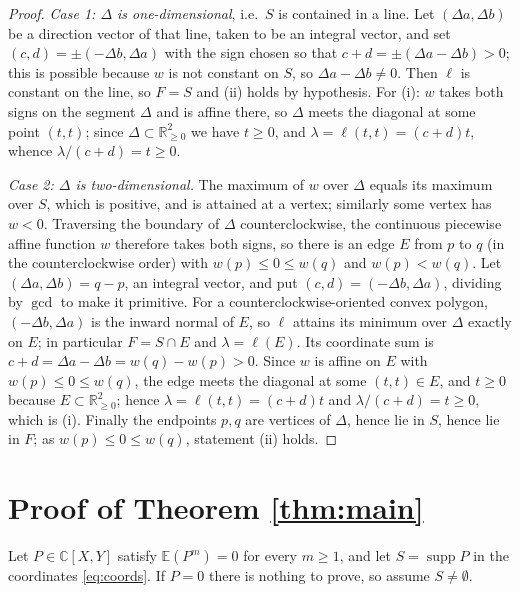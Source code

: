 \documentclass[10pt,a4paper]{amsart}
\numberwithin{equation}{section}
\DeclareMathOperator{\supp}{supp}
\newcommand{\C}{\mathbb{C}}
\newcommand{\E}{\mathbb{E}}
\begin{document}
\begin{proof}
\emph{Case 1: $\Delta$ is one-dimensional}, i.e.\ $S$ is contained in a line.
Let $(\Delta a,\Delta b)$ be a direction vector of that line, taken to be an
integral vector, and set $(c,d)=\pm(-\Delta b,\Delta a)$ with the sign chosen so
that $c+d=\pm(\Delta a-\Delta b)>0$; this is possible because $w$ is not
constant on $S$, so $\Delta a-\Delta b\ne0$. Then $\ell$ is constant on the
line, so $F=S$ and (ii) holds by hypothesis. For (i): $w$ takes both signs on
the segment $\Delta$ and is affine there, so $\Delta$ meets the diagonal at some
point $(t,t)$; since $\Delta\subset\mathbb R_{\ge0}^2$ we have $t\ge0$, and
$\lambda=\ell(t,t)=(c+d)t$, whence $\lambda/(c+d)=t\ge0$.

\emph{Case 2: $\Delta$ is two-dimensional.} The maximum of $w$ over $\Delta$
equals its maximum over $S$, which is positive, and is attained at a vertex;
similarly some vertex has $w<0$. Traversing the boundary of $\Delta$
counterclockwise, the continuous piecewise affine function $w$ therefore takes
both signs, so there is an edge $E$ from $p$ to $q$ (in the counterclockwise
order) with $w(p)\le0\le w(q)$ and $w(p)<w(q)$. Let
$(\Delta a,\Delta b)=q-p$, an integral vector, and put
$(c,d)=(-\Delta b,\Delta a)$, dividing by $\gcd$ to make it primitive. For a
counterclockwise-oriented convex polygon, $(-\Delta b,\Delta a)$ is the inward
normal of $E$, so $\ell$ attains its minimum over $\Delta$ exactly on $E$; in
particular $F=S\cap E$ and $\lambda=\ell(E)$. Its coordinate sum is
$c+d=\Delta a-\Delta b=w(q)-w(p)>0$. Since $w$ is affine on $E$ with
$w(p)\le0\le w(q)$, the edge meets the diagonal at some $(t,t)\in E$, and
$t\ge0$ because $E\subset\mathbb R_{\ge0}^2$; hence
$\lambda=\ell(t,t)=(c+d)t$ and $\lambda/(c+d)=t\ge0$, which is (i). Finally the
endpoints $p,q$ are vertices of $\Delta$, hence lie in $S$, hence lie in $F$;
as $w(p)\le0\le w(q)$, statement (ii) holds.
\end{proof}

\section{Proof of Theorem \ref{thm:main}}\label{sec:proof}

Let $P\in\C[X,Y]$ satisfy $\E(P^m)=0$ for every $m\ge1$, and let $S=\supp P$ in
the coordinates \eqref{eq:coords}. If $P=0$ there is nothing to prove, so assume
$S\ne\emptyset$.
\end{document}
